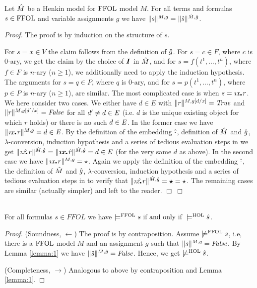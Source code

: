 \begin{lemma}\label{lemma:1} \sloppy
  Let $\hat{M}$ be a Henkin model for $\text{\textrm{FFOL}}$ model $M$. For all
  terms and formulas $s\in \text{\textrm{FFOL}}$ and variable assignments $g$ we have $\| s
  \|^{M,g} = \| \hat{s} \|^{\hat{M}, \hat{g}}$.


\begin{proof} 
  The proof is by induction on the structure of $s$.

  For $s=x\in V$ the claim follows from the definition of
  $\hat{g}$. For $s=c\in F$, where $c$ is $0$-ary, we get the claim by
  the choice of $\boldsymbol{I}$ in $\hat{M}$, and for $s=f(t^1,\ldots,t^n)$,
  where $f\in F$ is $n$-ary ($n\geq 1$), we additionally need to apply
  the induction hypothesis. The arguments for $s=q\in P$, where $q$ is
  $0$-ary, and for $s=p(t^1,\ldots,t^n)$, where $p\in P$ is $n$-ary
  ($n\geq 1$), are similar.  The most complicated case is when
  $s=\Descr x\lambdot r$. We here consider two cases. We either have
  $d \in E$ with
  $\| r \|^{M,g[d/x]} = \mathit{True}$ and $\| r \|^{M,g[d'/x]} = \mathit{False}$ for
  all $d'\not=d\in \mathit{E}$ (i.e. $d$ is the unique existing object for
  which $r$ holds) or there is no such $d\in \mathit{E}$. In the former case
  we have $\| \Descr x\lambdot r \|^{M,g} = d \in \ex$. By the
  definition of the embedding $\hat{\cdot}$, definition of $\hat{M}$ and
  $\hat{g}$, $\lambda$-conversion, induction hypothesis and a series of tedious evaluation
  steps in \HOL we get
  $\| \map{\Descr x\lambdot r} \|^{\map M, \map g} = \| \hol{\Descr
    x\lambdot} \map{r} \|^{\map M, \map g} = d \in \ex$
  (for the very same $d$ as above). In the second case we have
  $\| \Descr x\lambdot r \|^{M,g} = \star$. Again we apply the
  definition of the embedding $\hat{\cdot}$, the definition of $\hat{M}$
  and $\hat{g}$, $\lambda$-conversion, induction hypothesis and a series of tedious
  evaluation steps in \HOL to verify that
  $\| \map{\Descr x\lambdot r} \|^{\map M, \map g} = \hol{\star} =
  \star$. The remaining cases are similar (actually simpler) and left
  to the reader. $\Box$
\end{proof}
\end{lemma}


\begin{theorem}\ \\
For all formulas $s\in FFOL$ we have
 $\models^{\text{\textrm{FFOL}}} s \text{ if and only if }  \models^{\text{\textrm{HOL}}} \hat{s}$.


 \begin{proof} 
 (Soundness, $\leftarrow$) The proof is by
   contraposition. Assume $\not\models^{\text{\textrm{FFOL}}} s$, i.e, there is a
   $\text{\textrm{FFOL}}$ model $M$ and an assignment $g$ such that
   $\|s\|^{M,g}=\mathit{False}$. By Lemma \ref{lemma:1} we have $\| \hat{s}
   \|^{\hat{M}, \hat{g}}=\mathit{False}$. Hence, we get $\not\models^{\text{\textrm{HOL}}} \hat{s}$.

 (Completeness, $\rightarrow$) Analogous to above by contraposition
 and Lemma \ref{lemma:1}.
\end{proof}
\end{theorem} 

